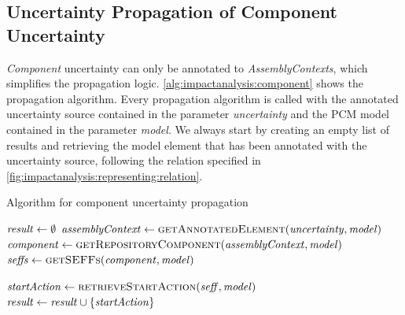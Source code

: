 

\subsection{Uncertainty Propagation of Component Uncertainty}

\emph{Component} uncertainty can only be annotated to \emph{AssemblyContexts}, which simplifies the propagation logic.
\autoref{alg:impactanalysis:component} shows the propagation algorithm.
Every propagation algorithm is called with the annotated uncertainty source contained in the parameter \emph{uncertainty} and the \ac{PCM} model contained in the parameter \emph{model}.
We always start by creating an empty list of results and retrieving the model element that has been annotated with the uncertainty source, following the relation specified in \autoref{fig:impactanalysis:representing:relation}.

\begin{algorithm}
    \caption{Algorithm for component uncertainty propagation}
    \label{alg:impactanalysis:component}
    \begin{algorithmic}[1]
            \algindentskip
            \State $\mathit{result} \gets \emptyset$
            \State $\mathit{assemblyContext} \gets \textsc{getAnnotatedElement}(\mathit{uncertainty}, \mathit{model})$
            \State $\mathit{component} \gets \textsc{getRepositoryComponent}(\mathit{assemblyContext}, \mathit{model})$ \label{alg:impactanalysis:component:4}
            \State $\mathit{seffs} \gets \textsc{getSEFFs}(\mathit{component}, \mathit{model})$ \label{alg:impactanalysis:component:5}
            \algblockskip

             \label{alg:impactanalysis:component:6} 
                \State $\mathit{startAction} \gets \textsc{retrieveStartAction}(\mathit{seff}, \mathit{model})$
                \State $\mathit{result} \gets \mathit{result} \cup \{ \mathit{startAction} \}$ \label{alg:impactanalysis:component:11}
            \EndFor
            \algblockskip
        
            \State {} \label{alg:impactanalysis:component:10}
            \algindentskip
        \EndProcedure   
    \end{algorithmic}
\end{algorithm}

